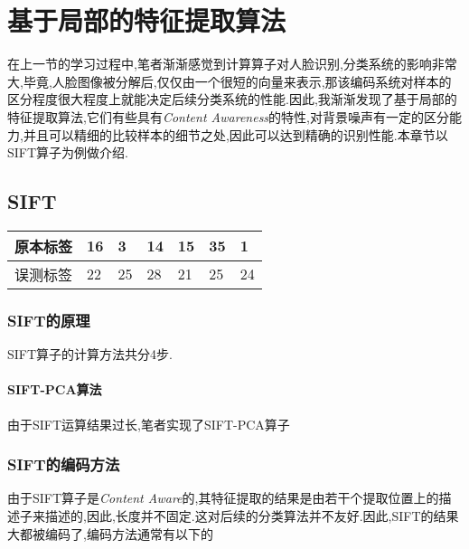 \chapter{基于局部的特征提取算法}
在上一节的学习过程中,笔者渐渐感觉到计算算子对人脸识别,分类系统的影响非常大,毕竟,人脸图像被分解后,仅仅由一个很短的向量来表示,那该编码系统对样本的区分程度很大程度上就能决定后续分类系统的性能.因此,我渐渐发现了基于局部的特征提取算法,它们有些具有\textit{Content Awareness}的特性,对背景噪声有一定的区分能力,并且可以精细的比较样本的细节之处,因此可以达到精确的识别性能.本章节以SIFT算子为例做介绍.
\section{SIFT}
	\begin{center}
	\begin{tabular}{|l|l|l|l|l|l|l|}
\hline
原本标签&16&3&14&15&35&1\\\hline
误测标签&22&25&28&21&25&24\\\hline
\end{tabular}
\end{center}
\subsection{SIFT的原理}
SIFT算子的计算方法共分4步.

\subsubsection{SIFT-PCA算法}
由于SIFT运算结果过长,笔者实现了SIFT-PCA算子

\subsection{SIFT的编码方法}
由于SIFT算子是\textit{Content Aware}的,其特征提取的结果是由若干个提取位置上的描述子来描述的,因此,长度并不固定.这对后续的分类算法并不友好.因此,SIFT的结果大都被编码了,编码方法通常有以下的
